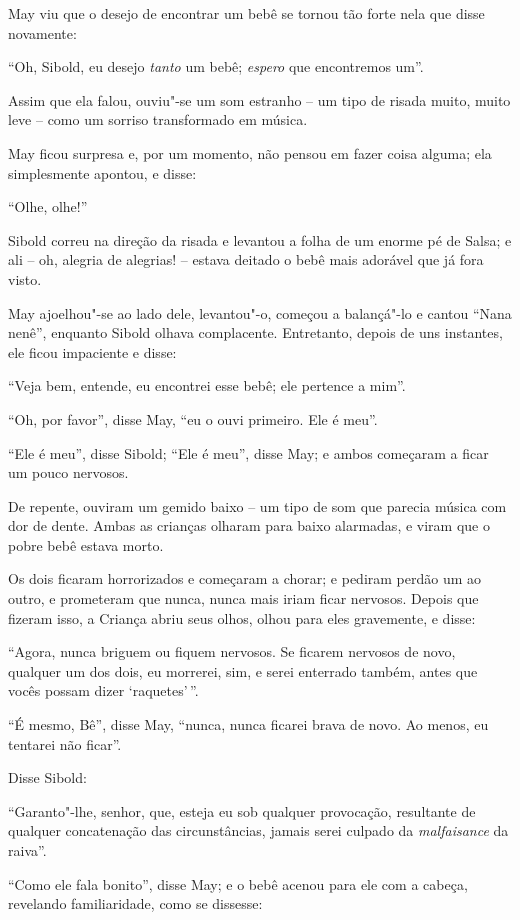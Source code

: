 May viu que o desejo de encontrar um bebê se tornou tão forte nela que
disse novamente:

``Oh, Sibold, eu desejo \emph{tanto} um bebê; \emph{espero} que
encontremos um''.

Assim que ela falou, ouviu"-se um som estranho -- um tipo de risada
muito, muito leve -- como um sorriso transformado em música.

May ficou surpresa e, por um momento, não pensou em fazer coisa alguma;
ela simplesmente apontou, e disse:

``Olhe, olhe!''

Sibold correu na direção da risada e levantou a folha de um enorme pé de
Salsa; e ali -- oh, alegria de alegrias! -- estava deitado o bebê mais
adorável que já fora visto.

May ajoelhou"-se ao lado dele, levantou"-o, começou a balançá"-lo e cantou
``Nana nenê'', enquanto Sibold olhava complacente. Entretanto, depois de
uns instantes, ele ficou impaciente e disse:

``Veja bem, entende, eu encontrei esse bebê; ele pertence a mim''.

``Oh, por favor'', disse May, ``eu o ouvi primeiro. Ele é meu''.

``Ele é meu'', disse Sibold; ``Ele é meu'', disse May; e ambos começaram
a ficar um pouco nervosos.

De repente, ouviram um gemido baixo -- um tipo de som que parecia música
com dor de dente. Ambas as crianças olharam para baixo alarmadas, e
viram que o pobre bebê estava morto.

Os dois ficaram horrorizados e começaram a chorar; e pediram perdão um
ao outro, e prometeram que nunca, nunca mais iriam ficar nervosos.
Depois que fizeram isso, a Criança abriu seus olhos, olhou para eles
gravemente, e disse:

``Agora, nunca briguem ou fiquem nervosos. Se ficarem nervosos de novo,
qualquer um dos dois, eu morrerei, sim, e serei enterrado também, antes
que vocês possam dizer `raquetes'\,''.

``É mesmo, Bê'', disse May, ``nunca, nunca ficarei brava de novo. Ao
menos, eu tentarei não ficar''.

Disse Sibold:

``Garanto"-lhe, senhor, que, esteja eu sob qualquer provocação,
resultante de qualquer concatenação das circunstâncias, jamais serei
culpado da \emph{malfaisance} da raiva''.

``Como ele fala bonito'', disse May; e o bebê acenou para ele com a
cabeça, revelando familiaridade, como se dissesse:

